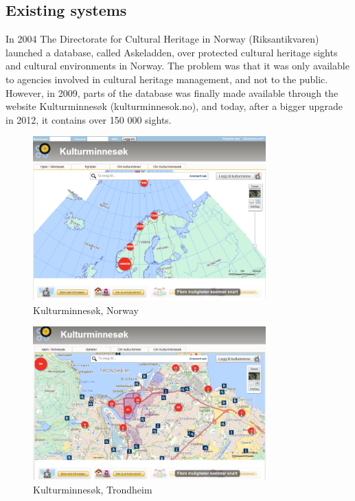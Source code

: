 \documentclass[11pt]{book}
\begin{document}
\subsection{Existing systems}
In 2004 The Directorate for Cultural Heritage in Norway (Riksantikvaren) launched a database, called Askeladden, over protected cultural heritage sights and cultural environments in Norway. The problem was that it was only available to agencies involved in cultural heritage management, and not to the public. However,  in 2009, parts of the database was finally made available through the website Kulturminnesøk (kulturminnesok.no), and today, after a bigger upgrade in 2012, it contains over 150 000 sights.

\begin{figure}[H]
      \centering
      \includegraphics[width=0.8\textwidth]{Figures/Prestudy/kulturminnesokOversikt.png}
      \caption{Kulturminnesøk, Norway}
      \label{fig:pre_kulturoversikt}
\end{figure}

\begin{figure}[H]
      \centering
      \includegraphics[width=0.8\textwidth]{Figures/Prestudy/kulturminnesokTrondheim.png}
      \caption{Kulturminnesøk, Trondheim}
      \label{fig:pre_kulturTrondheim}
\end{figure}
\end{document}
